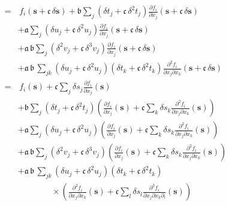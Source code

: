 \begin{align*}
\\
%
=& \,
f_{i} \! \left( \mathbf{s} + \mathfrak{c} \, \delta \mathbf{s} \right) + \mathfrak{b} 
\sum_{j} \left( \delta t_{j} + \mathfrak{c} \, \delta^{2} t_{j} \right) 
\frac{ \partial f_{i} }{ \partial x_{j} } \! \left( \mathbf{s} + \mathfrak{c} \, \delta \mathbf{s}\right)
\\
&+ 
\mathfrak{a} \sum_{j}
\left( \delta u_{j} + \mathfrak{c} \, \delta^{2} u_{j} \right) 
\frac{ \partial f_{i} }{ \partial x_{j} } \! \left( \mathbf{s} + \mathfrak{c} \, \delta \mathbf{s}\right)
\\
& + \mathfrak{a} \, \mathfrak{b} \sum_{j}
\left( \delta^{2} v_{j} + \mathfrak{c} \, \delta^{3} v_{j} \right) 
\frac{ \partial f_{i} }{ \partial x_{j} } \! \left( \mathbf{s} + \mathfrak{c} \, \delta \mathbf{s} \right)
\\
&+ 
\mathfrak{a} \, \mathfrak{b} \, \sum_{jk} 
\left( \delta u_{j} + \mathfrak{c} \, \delta^{2} u_{j} \right) 
\left( \delta t_{k} + \mathfrak{c} \, \delta^{2} t_{k} \right)
\frac{ \partial^{2} f_{i} }{ \partial x_{j} \partial x_{k} } \! \left( \mathbf{s} + \mathfrak{c} \, \delta \mathbf{s} \right)
\\
%
=& \,
f_{i} \! \left( \mathbf{s} \right) + \mathfrak{c} \sum_{j} \delta s_{j} 
\frac{ \partial f_{i} }{ \partial x_{j} } \! \left( \mathbf{s} \right)
\\
&+ 
\mathfrak{b}
\sum_{j} \left( \delta t_{j} + \mathfrak{c} \, \delta^{2} t_{j} \right) 
\left( \frac{ \partial f_{i} }{ \partial x_{j} } \! \left( \mathbf{s} \right) 
+  \mathfrak{c} \sum_{k} \delta s_{k} 
\frac{ \partial^{2} f_{i} }{ \partial x_{j} \partial x_{k} } \! \left( \mathbf{s} \right) \right)
\\
&+ 
\mathfrak{a} \sum_{j}
\left( \delta u_{j} + \mathfrak{c} \, \delta^{2} u_{j} \right) 
\left( \frac{ \partial f_{i} }{ \partial x_{j} } \! \left( \mathbf{s} \right) 
+ \mathfrak{c} \sum_{k} \delta s_{k} 
\frac{ \partial^{2} f_{i} }{ \partial x_{j} \partial x_{k} } \! \left( \mathbf{s} \right) \right)
\\
& + \mathfrak{a} \, \mathfrak{b} \sum_{j}
\left( \delta^{2} v_{j} + \mathfrak{c} \, \delta^{3} v_{j} \right) 
\left( \frac{ \partial f_{i} }{ \partial x_{j} } \! \left( \mathbf{s} \right) 
+ \mathfrak{c} \sum_{k} \delta s_{k} 
\frac{ \partial^{2} f_{i} }{ \partial x_{j} \partial x_{k} } \! \left( \mathbf{s} \right) \right)
\\
&+ 
\mathfrak{a} \, \mathfrak{b} \, \sum_{jk} 
\left( \delta u_{j} + \mathfrak{c} \, \delta^{2} u_{j} \right) 
\left( \delta t_{k} + \mathfrak{c} \, \delta^{2} t_{k} \right)
\\
& \quad\quad\quad\quad \times \left(
\frac{ \partial^{2} f_{i} }{ \partial x_{j} \partial x_{k} } \! \left( \mathbf{s} \right) 
+ \mathfrak{c} \sum_{l} \delta s_{l} 
\frac{ \partial^{3} f_{i} }{ \partial x_{j} \partial x_{k} \partial_{l} } \! \left( \mathbf{s} \right)
\right)
\\
%
\end{align*}

